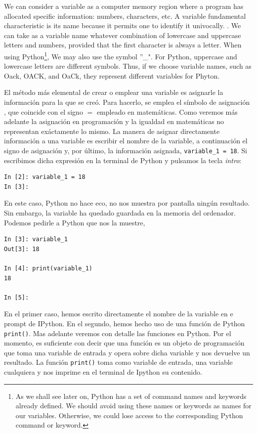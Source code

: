 \begin{paracol}{2}
\switchcolumn
We can consider a variable as a computer memory region where a program has allocated specific information: numbers, characters, etc. A variable fundamental characteristic is its name because it permits one to identify it univocally. . We can take as a variable name whatever combination of lowercase and uppercase letters and numbers, provided that the first character is always a letter. When using Python\footnote{As we shall see later on, Python has a set of command names and keywords already defined. We should avoid using these names or keywords as names for our variables. Otherwise, we could lose access to the corresponding Python command or keyword.}, We may also use the symbol ''\_". For Python, uppercase and lowercase letters are different symbols. Thus, if we choose variable names, such as Oack, OACK, and OaCk, they represent different variables for Phyton.

\switchcolumn
El método más elemental de crear o emplear una variable es asignarle la información para la que se creó. Para hacerlo, se emplea el símbolo de asignación  , que coincide con el signo $=$ empleado en matemáticas. Como veremos más adelante la asignación en programación y la igualdad en matemáticas no representan exáctamente lo mismo. La manera de asignar directamente información a una variable es escribir el nombre de la variable, a continuación  el signo de asignación y, por último, la información asignada, \texttt{variable_1 = 18}. Si escribimos dicha expresión en la terminal de Python y pulsamos la tecla \emph{intro}:
\begin{verbatim}
In [2]: variable_1 = 18
In [3]:
\end{verbatim}
En este caso, Python no hace eco, no nos muestra por pantalla ningún resultado. Sin embargo, la variable ha quedado guardada en la memoria del ordenador. Podemos pedirle a Python que nos la muestre, 
\begin{verbatim}
In [3]: variable_1
Out[3]: 18

In [4]: print(variable_1)
18

In [5]: 
\end{verbatim}
En el primer caso, hemos escrito directamente el nombre de la variable en e prompt de IPython. En el segundo, hemos hecho uso de una función de Python \texttt{print()}. Mas adelante veremos con detalle las funciones en Python. Por el momento, es suficiente con decir que una función es un objeto de programación que toma una variable de entrada y opera sobre dicha variable y nos devuelve un resultado. La  función \texttt{print()} toma como variable de entrada, una variable cualquiera y nos imprime en el terminal de Ipython su contenido.


\end{paracol}

